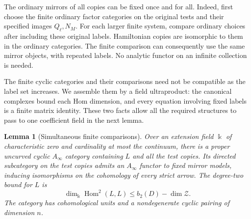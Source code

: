 \documentclass[11pt]{article}
\numberwithin{equation}{section}
\newtheorem{lemma}[theorem]{Lemma}
\theoremstyle{definition}
\theoremstyle{remark}
\begin{document}
The ordinary mirrors of all copies can be fixed once and for all.
Indeed, first choose the finite ordinary factor categories on the
original tests and their specified images $Q_\ell,N_M$.  For each larger
finite system, compare ordinary choices after including these original
labels.  Hamiltonian copies are isomorphic to them in the ordinary
categories.  The finite comparison can consequently use the same
mirror objects, with repeated labels.  No analytic functor on an
infinite collection is needed.

The finite cyclic categories and their comparisons need not be
compatible as the label set increases.  We assemble them by a field
ultraproduct: the canonical complexes bound each Hom dimension, and
every equation involving fixed labels is a finite matrix identity.
These two facts allow all the required structures to pass to one
coefficient field in the next lemma.

\begin{lemma}[Simultaneous finite comparisons]
\label{realization:field}
Over an extension field $\Bbbk$ of characteristic zero and cardinality
at most the continuum, there is a proper uncurved cyclic
$A_\infty$ category containing $L$ and all the test copies.  Its
directed subcategory on the test copies admits an $A_\infty$ functor to fixed mirror
models, inducing isomorphisms on the cohomology of every strict arrow.
The degree-two bound for $L$ is
\begin{equation}
 \dim_{\Bbbk}\operatorname{Hom}^2(L,L)
 \le b_2(D)-\dim\mathcal Z.
 \label{realization:ambient-bound}
\end{equation}
The category has cohomological units and a nondegenerate cyclic pairing
of dimension $n$.
\end{lemma}
\end{document}
